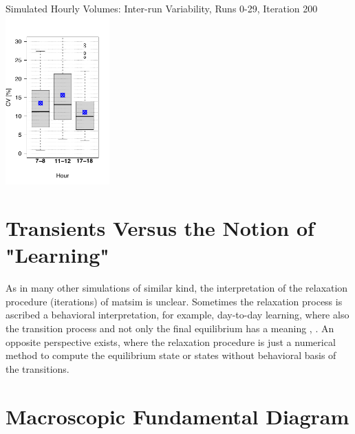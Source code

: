 {	{\label{fig:linkVolumesHour17-18InterScatter}}%
  {}%
	\createsubfigure%
  {Simulated Hourly Volumes: Inter-run Variability, Runs 0-29, Iteration 200}%
	{\includegraphics[width=0.3\textwidth]{understanding/figures/var/linkVolumesInter200.pdf}}%
	{\label{fig:linkVolumesInter200}}%
  {}%
}%
{} 

\vfill\eject
\section{Transients Versus the Notion of "Learning"}
\label{sec:transients-vs-learning}

As in many other simulations of similar kind, the interpretation of the relaxation procedure (iterations) of \gls{matsim} is unclear. 
%
Sometimes the relaxation process is ascribed a behavioral interpretation, for example, day-to-day learning, where also the transition process and not only the final equilibrium has a meaning \citep[][p.128]{LiuEtAl_TransResA_2006}, \citep[][p.523]{NagelBarrett1997feedback}. 
%
An opposite perspective exists, where the relaxation procedure is just a numerical method to compute the equilibrium state or states without behavioral basis of the transitions.


\vfill\eject
\section{Macroscopic Fundamental Diagram}
\label{sec:researchavenues-mfd}


\vfill\eject
